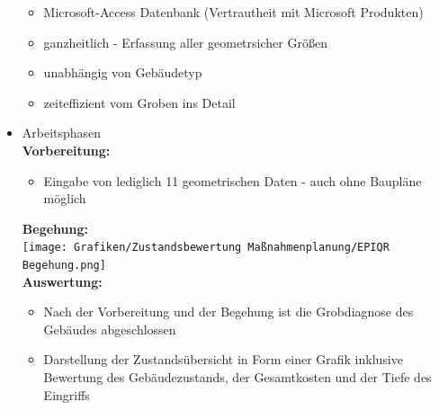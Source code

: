 \documentclass[fleqn,twoside,dvipsnames]{article}
\begin{document}
\begin{itemize}
\begin{itemize}
                    \item Microsoft-Access Datenbank (Vertrautheit mit Microsoft Produkten)
                    \item ganzheitlich - Erfassung aller geometrsicher Größen
                    \item unabhängig von Gebäudetyp
                    \item zeiteffizient vom Groben ins Detail
                \end{itemize}
            \item Arbeitsphasen\\
                    \textbf{Vorbereitung:}
                \begin{itemize}
                    \item Eingabe von lediglich 11 geometrischen Daten - auch ohne Baupläne möglich
                \end{itemize}
                \textbf{Begehung:}\\
                    \texttt{[image: Grafiken/Zustandsbewertung Maßnahmenplanung/EPIQR Begehung.png]}\\
                \textbf{Auswertung:}
                \begin{itemize}
                    \item Nach der Vorbereitung und der Begehung ist die Grobdiagnose des Gebäudes abgeschlossen
                    \item Darstellung der Zustandsübersicht in Form einer Grafik inklusive Bewertung des Gebäudezustands, der Gesamtkosten und der Tiefe des Eingriffs \vspace*{2mm} \\
\end{itemize}
\end{itemize}
\end{document}
